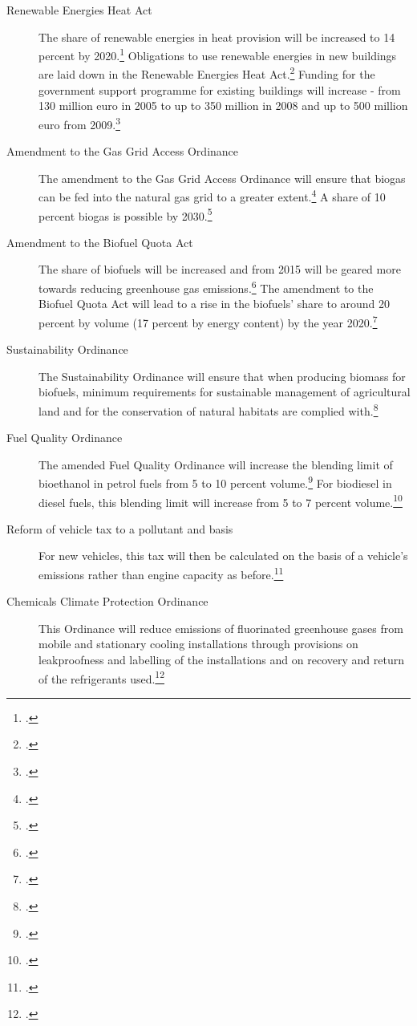 \begin{description}
	\item[Renewable Energies Heat Act] The share of renewable energies in heat provision will be increased to 14 percent by 2020.\footcite[][]{BMUprogramme}
	Obligations to use renewable energies in new buildings are laid down in the Renewable Energies Heat Act.\footcite[][]{BMUprogramme}
	Funding for the government support programme for existing buildings will increase - from 130 million euro in 2005 to up to 350 million in 2008 and up to 500 million euro from 2009.\footcite[][]{BMUprogramme}
	\item[Amendment to the Gas Grid Access Ordinance] The amendment to the Gas Grid Access Ordinance will ensure that biogas can be fed into the natural gas grid to a greater extent.\footcite[][]{BMUprogramme}
	A share of 10 percent biogas is possible by 2030.\footcite[][]{BMUprogramme}
	\item[Amendment to the Biofuel Quota Act] The share of biofuels will be increased and from 2015 will be geared more towards reducing greenhouse gas emissions.\footcite[][]{BMUprogramme}
	The amendment to the Biofuel Quota Act will lead to a rise in the biofuels’ share to around 20 percent by volume (17 percent by energy content) by the year 2020.\footcite[][]{BMUprogramme}
	\item[Sustainability Ordinance] The Sustainability Ordinance will ensure that when producing biomass for biofuels, minimum requirements for sustainable management of agricultural land and for the conservation of natural habitats are complied with.\footcite[][]{BMUprogramme}
	\item[Fuel Quality Ordinance] The amended Fuel Quality Ordinance will increase the blending limit of bioethanol in petrol fuels from 5 to 10 percent volume.\footcite[][]{BMUprogramme}
	For biodiesel in diesel fuels, this blending limit will increase from 5 to 7 percent volume.\footcite[][]{BMUprogramme}
	\item[Reform of vehicle tax to a pollutant and  basis] For new vehicles, this tax will then be calculated on the basis of a vehicle's emissions rather than engine capacity as before.\footcite[][]{BMUprogramme}
	\item[Chemicals Climate Protection Ordinance] This Ordinance will reduce emissions of fluorinated greenhouse gases from mobile and stationary cooling installations through provisions on leakproofness and labelling of the installations and on recovery and return of the refrigerants used.\footcite[][]{BMUprogramme}
\end{description}



